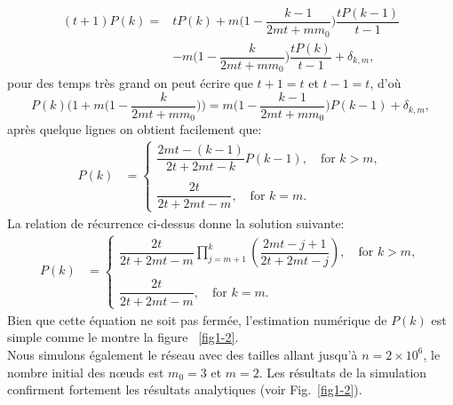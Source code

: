  \begin{equation}
  \begin{aligned}
  (t+1)P(k)= &tP(k)+m\big(1-\dfrac{k-1}{2mt+mm_0}\big)\dfrac{tP(k-1)}{t-1}\\
  &-m\big(1-\dfrac{k}{2mt+mm_0}\big)\dfrac{tP(k)}{t-1} +\delta_{k,m},
  \end{aligned}
  \end{equation}
pour des temps très grand on peut écrire que $t+1=t$ et $t-1=t$, d'où
 \begin{equation}
 P(k)\big(1+m\big(1-\dfrac{k}{2mt+mm_0}\big)\big)=m\big(1-\dfrac{k-1}{2mt+mm_0}\big)P(k-1) +\delta_{k,m},
 \end{equation}
 après quelque lignes on obtient facilement que:
\begin{align}
P(k)&= 
\begin{cases}
\dfrac{2mt - (k-1)}{2t + 2mt - k}P(k-1), \quad \textrm{for }  k>m,\\
\\
\dfrac{2t}{2t + 2mt - m}, \quad\textrm{for }  k=m.
\end{cases}
\end{align}
La relation de récurrence ci-dessus donne la solution suivante:
\begin{align}
P(k)&= 
\begin{cases}
\dfrac{2t}{2t + 2mt - m}\prod^k_{j=m+1}\left( \dfrac{2mt -j + 1}{2t + 2mt - j}\right), \quad \textrm{for }  k>m,\\
\\
\dfrac{2t}{2t + 2mt - m}, \quad\textrm{for }  k=m.
\end{cases}
\label{eq4-2}
\end{align}
Bien que cette équation ne soit pas fermée, l'estimation numérique de $ P (k) $ est simple comme le montre la figure ~\ref{fig1-2}. \\
Nous simulons également le réseau avec des tailles allant jusqu'à $n=2\times10^6$, le nombre initial des nœuds est $m_0=3$ et $m=2$. 
Les résultats de la simulation confirment fortement les résultats analytiques (voir Fig.~\ref{fig1-2}). 

